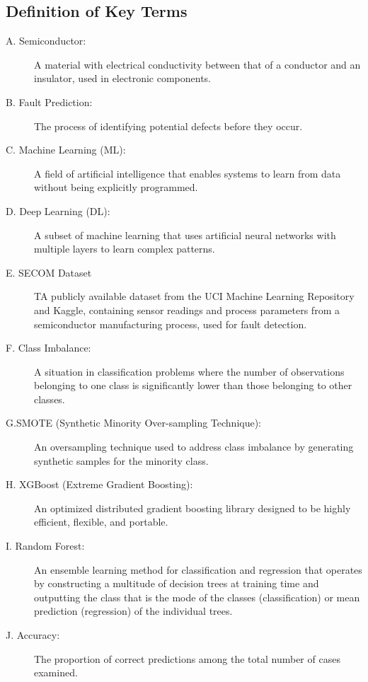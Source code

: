 \documentclass[12pt,oneside]{article}
\begin{document}
\subsection{Definition of Key Terms}
\begin{description}
    \item[\textcolor{DeepMaroon}{A. Semiconductor:}] A material with electrical conductivity between that of a conductor and an insulator, used in electronic components.
    \item[\textcolor{DeepMaroon}{B. Fault Prediction:}] The process of identifying potential defects before they occur.
    \item[\textcolor{DeepMaroon}{C. Machine Learning (ML): }] A field of artificial intelligence that enables systems to learn from data without being explicitly programmed.
     \item[\textcolor{DeepMaroon}{D. Deep Learning (DL): }] A subset of machine learning that uses artificial neural networks with multiple layers to learn complex patterns.
     \item[\textcolor{DeepMaroon}{E. SECOM Dataset}] TA publicly available dataset from the UCI Machine Learning Repository and Kaggle, containing sensor readings and process parameters from a semiconductor manufacturing process, used for fault detection.
      \item[\textcolor{DeepMaroon}{F.	Class Imbalance: }] A situation in classification problems where the number of observations belonging to one class is significantly lower than those belonging to other classes.
       \item[\textcolor{DeepMaroon}{G.SMOTE (Synthetic Minority Over-sampling Technique): }] An oversampling technique used to address class imbalance by generating synthetic samples for the minority class.
       \item[\textcolor{DeepMaroon}{H.	XGBoost (Extreme Gradient Boosting): }] An optimized distributed gradient boosting library designed to be highly efficient, flexible, and portable.
       \item[\textcolor{DeepMaroon}{I. Random Forest: }] An ensemble learning method for classification and regression that operates by constructing a multitude of decision trees at training time and outputting the class that is the mode of the classes (classification) or mean prediction (regression) of the individual trees.
        \item[\textcolor{DeepMaroon}{J. Accuracy:}] The proportion of correct predictions among the total number of cases examined.

\end{description}
\end{document}
